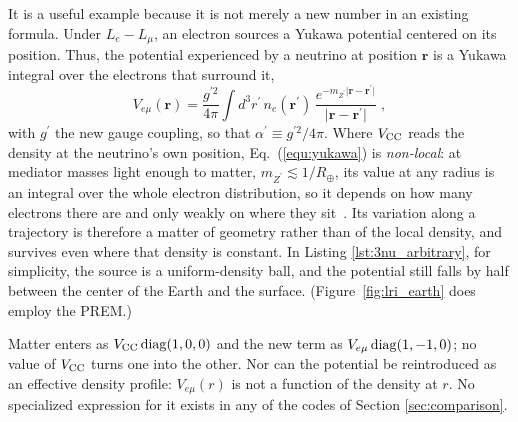\documentclass[final,5p,times,twocolumn,sort,compress]{elsarticle}
\newcommand{\eq}{Eq.}
\newcommand{\equ}[1]{\eq~(\ref{equ:#1})}
\begin{document}
It is a useful example because it is not merely a new number in an existing formula.  Under $L_e - L_\mu$, an electron sources a Yukawa potential centered on its position.  Thus, the potential experienced by a neutrino at position $\mathbf{r}$ is a Yukawa integral over the electrons that surround it,
\begin{equation}
 \label{equ:yukawa}
 V_{e\mu}(\mathbf{r})
 =
 \frac{g^{\prime 2}}{4\pi}
 \int d^3r^\prime \, n_e(\mathbf{r}^\prime) \,
 \frac{e^{-m_{Z^\prime} \lvert \mathbf{r} - \mathbf{r}^\prime \rvert}}
      {\lvert \mathbf{r} - \mathbf{r}^\prime \rvert} \;,
\end{equation}
with $g^\prime$ the new gauge coupling, so that $\alpha^\prime \equiv g^{\prime 2}/4\pi$.  Where $V_{\rm CC}$ reads the density at the neutrino's own position, \equ{yukawa} is \emph{non-local}: at mediator masses light enough to matter, $m_{Z^\prime} \lesssim 1/R_\oplus$, its value at any radius is an integral over the whole electron distribution, so it depends on how many electrons there are and only weakly on where they sit\ \cite{Wise:2018rnb}.  Its variation along a trajectory is therefore a matter of geometry rather than of the local density, and survives even where that density is constant. In Listing \ref{lst:3nu_arbitrary}, for simplicity, the source is a uniform-density ball, and the potential still falls by half between the center of the Earth and the surface.  (Figure~\ref{fig:lri_earth} does employ the PREM.)

Matter enters as $V_{\rm CC}\,{\rm diag}(1,0,0)$ and the new term as $V_{e\mu}\,{\rm diag}(1,-1,0)$; no value of $V_{\rm CC}$ turns one into the other.  Nor can the potential be reintroduced as an effective density profile: $V_{e\mu}(r)$ is not a function of the density at $r$.  No specialized expression for it exists in any of the codes of Section \ref{sec:comparison}.
\end{document}
